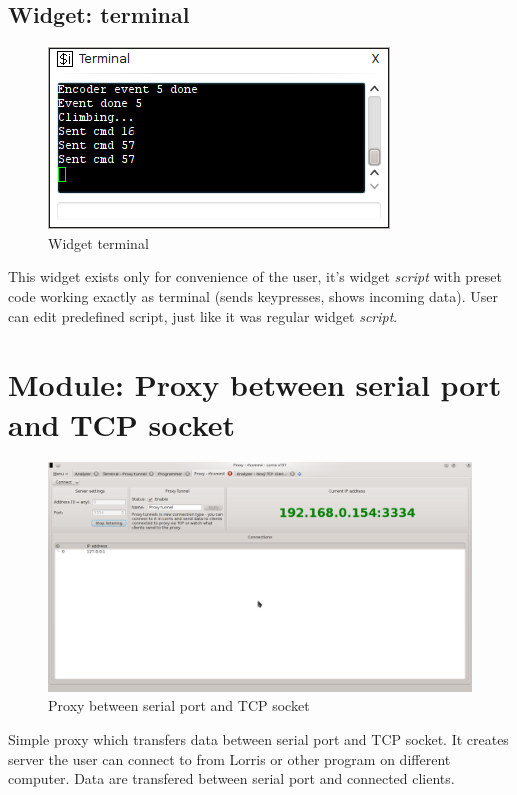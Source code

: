 \documentclass[12pt, a4paper, oneside]{article}
\newcommand{\It}{\textit}  %
\begin{document}
\subsection{Widget: terminal}
\begin{figure}[H]
\begin{center}
\includegraphics[scale=0.8]{img/w_terminal.png}
\caption{Widget terminal}
\end{center}
\end{figure}
This widget exists only for convenience of the user, it's widget \It{script} with preset code working exactly as terminal (sends keypresses, shows incoming data). User can edit predefined script, just like it was regular widget \It{script}.

\newpage
\setlength{\voffset}{0mm} %
\pagestyle{plain}
\section{Module: Proxy between serial port and TCP socket}
\begin{figure}[H]
\begin{center}
\includegraphics[width=\textwidth]{img/proxy.png}
\caption{Proxy between serial port and TCP socket}
\label{Shupito}
\end{center}
\end{figure}
Simple proxy which transfers data between serial port and TCP socket. It creates server the user can connect to from Lorris or other program on different computer. Data are transfered between serial port and connected clients.
\end{document}

